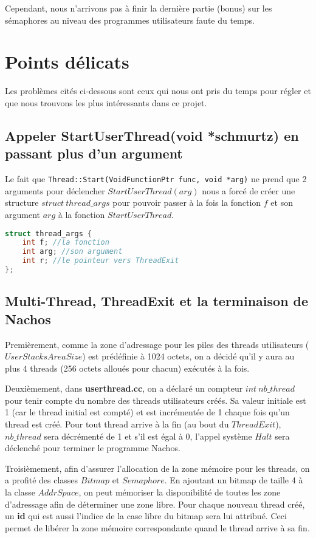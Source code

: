 \documentclass[12pt,a4paper]{article}
\begin{document}
Cependant, nous n'arrivons pas à finir la dernière partie (bonus) sur les sémaphores au niveau des programmes utilisateurs faute du temps.

\section{Points délicats}
Les problèmes cités ci-dessous sont ceux qui nous ont pris du temps pour régler et que nous trouvons les plus intéressants dans ce projet.

\subsection{Appeler StartUserThread(void *schmurtz) en passant plus d'un argument}
Le fait que \verb$Thread::Start(VoidFunctionPtr func, void *arg)$ ne prend que 2 arguments pour déclencher $StartUserThread(arg)$ nous a forcé de créer une structure $struct\ thread\_args$ pour pouvoir passer à la fois la fonction $f$ et son argument $arg$ à la fonction $StartUserThread$.
\begin{lstlisting}[language=C]
struct thread_args {
    int f; //la fonction
    int arg; //son argument
    int r; //le pointeur vers ThreadExit
};
\end{lstlisting}

\subsection{Multi-Thread, ThreadExit et la terminaison de Nachos}
Premièrement, comme la zone d'adressage pour les piles des threads utilisateurs ($UserStacksAreaSize$) est prédéfinie à 1024 octets, on a décidé qu'il y aura au plus 4 threads (256 octets alloués pour chacun) exécutés à la fois.

Deuxièmement, dans \textbf{userthread.cc}, on a déclaré un compteur $int\ nb\_thread$ pour tenir compte du nombre des threads utilisateurs créés. Sa valeur initiale est 1 (car le thread initial est compté) et est incrémentée de 1 chaque fois qu'un thread est créé. Pour tout thread arrive à la fin (au bout du $ThreadExit$), $nb\_thread$ sera décrémenté de 1 et s'il est égal à 0, l'appel système $Halt$ sera déclenché pour terminer le programme Nachos.

Troisièmement, afin d'assurer l'allocation de la zone mémoire pour les threads, on a profité des classes $Bitmap$ et $Semaphore$. En ajoutant un bitmap de taille 4 à la classe $AddrSpace$, on peut mémoriser la disponibilité de toutes les zone d'adressage afin de déterminer une zone libre. Pour chaque nouveau thread créé, un \textbf{id} qui est aussi l'indice de la case libre du bitmap sera lui attribué. Ceci permet de libérer la zone mémoire correspondante quand le thread arrive à sa fin. 
\end{document}
